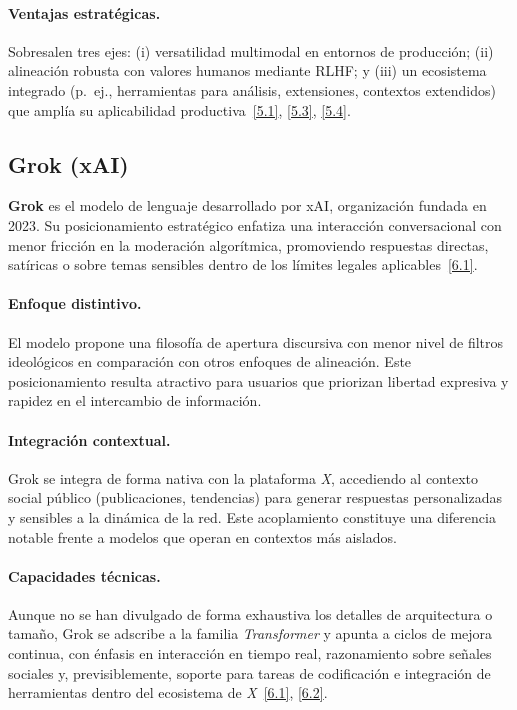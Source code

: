 \documentclass[12pt,a4paper]{report}
\numberwithin{figure}{section}
\begin{document}
\paragraph{Ventajas estratégicas.}
Sobresalen tres ejes: (i) versatilidad multimodal en entornos de producción; (ii) alineación robusta con valores humanos mediante RLHF; y (iii) un ecosistema integrado (p.~ej., herramientas para análisis, extensiones, contextos extendidos) que amplía su aplicabilidad productiva~\hyperref[ref:5.1]{[5.1]}, \hyperref[ref:5.3]{[5.3]}, \hyperref[ref:5.4]{[5.4]}.

\subsection{Grok (xAI)}
\label{subsec:grok_xai}

\textbf{Grok} es el modelo de lenguaje desarrollado por xAI, organización fundada en 2023. Su posicionamiento estratégico enfatiza una interacción conversacional con menor fricción en la moderación algorítmica, promoviendo respuestas directas, satíricas o sobre temas sensibles dentro de los límites legales aplicables~\hyperref[ref:6.1]{[6.1]}.

\paragraph{Enfoque distintivo.}
El modelo propone una filosofía de apertura discursiva con menor nivel de filtros ideológicos en comparación con otros enfoques de alineación. Este posicionamiento resulta atractivo para usuarios que priorizan libertad expresiva y rapidez en el intercambio de información.

\paragraph{Integración contextual.}
Grok se integra de forma nativa con la plataforma \textit{X}, accediendo al contexto social público (publicaciones, tendencias) para generar respuestas personalizadas y sensibles a la dinámica de la red. Este acoplamiento constituye una diferencia notable frente a modelos que operan en contextos más aislados.

\paragraph{Capacidades técnicas.}
Aunque no se han divulgado de forma exhaustiva los detalles de arquitectura o tamaño, Grok se adscribe a la familia \textit{Transformer} y apunta a ciclos de mejora continua, con énfasis en interacción en tiempo real, razonamiento sobre señales sociales y, previsiblemente, soporte para tareas de codificación e integración de herramientas dentro del ecosistema de \textit{X}~\hyperref[ref:6.1]{[6.1]}, \hyperref[ref:6.2]{[6.2]}.
\end{document}
